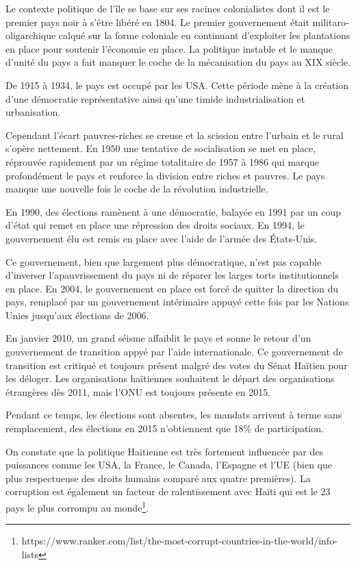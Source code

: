 \documentclass[a4paper, 11pt]{article}
\begin{document}
  Le contexte politique de l'île se base sur ses racines colonialistes dont il est le premier pays noir à s'être libéré en 1804. Le premier gouvernement était militaro-oligarchique calqué sur la forme coloniale en continuant d'exploiter les plantations en place pour soutenir l'économie en place. La politique instable et le manque d'unité du pays a fait manquer le coche de la mécanisation du pays au XIX siècle.

  De 1915 à 1934, le pays est occupé par les USA. Cette période mène à la création d'une démocratie représentative ainsi qu'une timide industrialisation et urbanisation.

  Cependant l'écart pauvres-riches se creuse et la scission entre l'urbain et le rural s'opère nettement. En 1950 une tentative de socialisation se met en place, réprouvée rapidement par un régime totalitaire de 1957 à 1986 qui marque profondément le pays et renforce la division entre riches et pauvres. Le pays manque une nouvelle fois le coche de la révolution industrielle.

  En 1990, des élections ramènent à une démocratie, balayée en 1991 par un coup d'état qui remet en place une répression des droits sociaux. En 1994, le gouvernement élu est remis en place avec l'aide de l'armée des \'Etats-Unis.

  Ce gouvernement, bien que largement plus démocratique, n'est pas capable d'inverser l'apauvrissement du pays ni de réparer les larges torts institutionnels en place. En 2004, le gouvernement en place est forcé de quitter la direction du pays, remplacé par un gouvernement intérimaire appuyé cette fois par les Nations Unies jusqu'aux élections de 2006.

  En janvier 2010, un grand séisme affaiblit le pays et sonne le retour d'un gouvernement de transition appyé par l'aide internationale. Ce gouvernement de transition est critiqué et toujours présent malgré des votes du Sénat Haïtien pour les déloger. Les organisations haïtiennes souhaitent le départ des organisations étrangères dès 2011, mais l'ONU est toujours présente en 2015.

  Pendant ce temps, les élections sont absentes, les mandats arrivent à terme sans remplacement, des élections en 2015 n'obtiennent que 18\% de participation.

  On constate que la politique Haïtienne est très fortement influencée par des puissances comme les USA, la France, le Canada, l'Espagne et l'UE (bien que plus respectueuse des droits humains comparé aux quatre premières). La corruption est également un facteur de ralentissement avec Haïti qui est le 23 pays le plus corrompu au monde\footnote{https://www.ranker.com/list/the-most-corrupt-countries-in-the-world/info-lists}.
\end{document}

